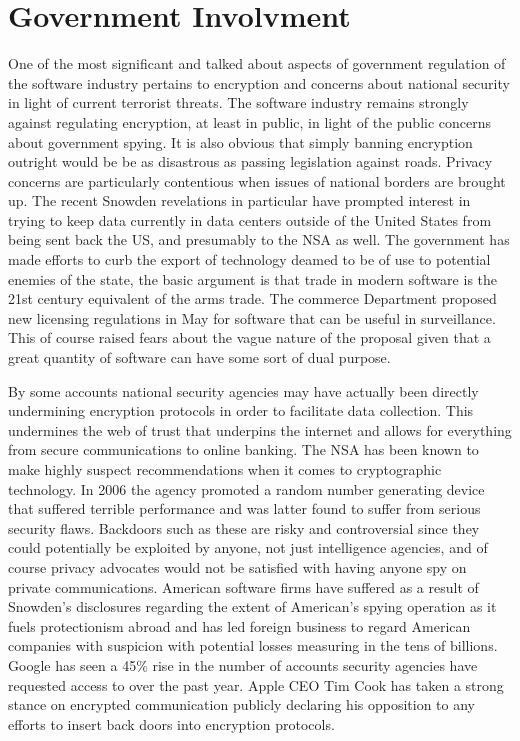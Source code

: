 \section*{Government Involvment}

One of the most significant and talked about aspects of government regulation of the software industry pertains to encryption and concerns about national security in light of current terrorist threats.\autocite[]{TerroristData}
The software industry remains strongly against regulating encryption, at least in public, in light of the public concerns about government spying.\autocite[]{TerroristData}
It is also obvious that simply banning encryption outright would be be as disastrous as passing legislation against roads.\autocite[]{TerroristData}
Privacy concerns are particularly contentious when issues of national borders are brought up. The recent Snowden revelations in particular have prompted interest in trying to keep data currently in data centers outside of the United States from being sent back the US, and presumably to the NSA as well.\autocite[]{OffMyCloud}
The government has made efforts to curb the export of technology deamed to be of use to potential enemies of the state, the basic argument is that trade in modern software is the 21st century equivalent of the arms trade.\autocite[]{HeatsUpSurveillance}
The commerce Department proposed new licensing regulations in May for software that can be useful in surveillance. This of course raised fears about the vague nature of the proposal given that a great quantity of software can have some sort of dual purpose.\autocite[]{HeatsUpSurveillance}

By some accounts national security agencies may have actually been directly undermining encryption protocols in order to facilitate data collection.\autocite[]{CrackedCredibility}
This undermines the web of trust that underpins the internet and allows for everything from secure communications to online banking.\autocite[]{CrackedCredibility}
The NSA has been known to make highly suspect recommendations when it comes to cryptographic technology. In 2006 the agency promoted a random number generating device that suffered terrible performance and was latter found to suffer from serious security flaws.\autocite[]{CrackedCredibility}
Backdoors such as these are risky and controversial since they could potentially be exploited by anyone, not just intelligence agencies, and of course privacy advocates would not be satisfied with having anyone spy on private communications.\autocite[]{CrackedCredibility}
American software firms have suffered as a result of Snowden's disclosures regarding the extent of American's spying operation as it fuels protectionism abroad and has led foreign business to regard American companies with suspicion with potential losses measuring in the tens of billions.\autocite[]{CrackedCredibility}
Google has seen a 45\% rise in the number of accounts security agencies have requested access to over the past year.\autocite[]{DataRequests}
Apple CEO Tim Cook has taken a strong stance on encrypted communication publicly declaring his opposition to any efforts to insert back doors into encryption protocols.\autocite[]{StrongEncryptionCook}

